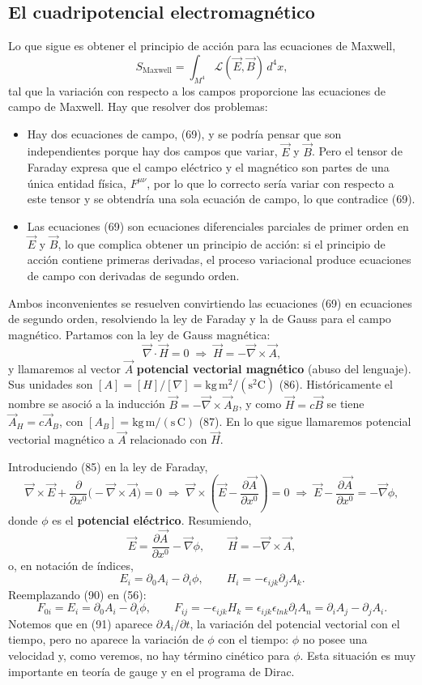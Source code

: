 \subsection{El cuadripotencial electromagnético}

Lo que sigue es obtener el principio de acción para las ecuaciones de
Maxwell,
\[
S_{\text{Maxwell}}=\int_{M^4}\mathscr{L}(\vec E,\vec B)\,d^4x, \tag{84}
\]
tal que la variación con respecto a los campos proporcione las
ecuaciones de campo de Maxwell. Hay que resolver dos problemas:
\begin{itemize}
\item Hay dos ecuaciones de campo, (69), y se podría pensar que son
independientes porque hay dos campos que variar, $\vec E$ y $\vec B$.
Pero el tensor de Faraday expresa que el campo eléctrico y el magnético
son partes de una única entidad física, $F^{\mu\nu}$, por lo que lo
correcto sería variar con respecto a este tensor y se obtendría una sola
ecuación de campo, lo que contradice (69).
\item Las ecuaciones (69) son ecuaciones diferenciales parciales de
primer orden en $\vec E$ y $\vec B$, lo que complica obtener un
principio de acción: si el principio de acción contiene primeras
derivadas, el proceso variacional produce ecuaciones de campo con
derivadas de segundo orden.
\end{itemize}
Ambos inconvenientes se resuelven convirtiendo las ecuaciones (69) en
ecuaciones de segundo orden, resolviendo la ley de Faraday y la de Gauss
para el campo magnético. Partamos con la ley de Gauss magnética:
\[
\vec\nabla\cdot\vec H=0\;\Longrightarrow\;\vec H=-\vec\nabla\times\vec A,
\tag{85}
\]
y llamaremos al vector $\vec A$ \textbf{potencial vectorial magnético}
(abuso del lenguaje). Sus unidades son $[A]=[H]/[\nabla]=\text{kg}\,
\text{m}^2/(\text{s}^2\text{C})$ (86). Históricamente el nombre se asoció
a la inducción $\vec B=-\vec\nabla\times\vec A_B$, y como $\vec H=c\vec B$
se tiene $\vec A_H=c\vec A_B$, con $[A_B]=\text{kg}\,\text{m}/(\text{s}\,
\text{C})$ (87). En lo que sigue llamaremos potencial vectorial magnético
a $\vec A$ relacionado con $\vec H$.

Introduciendo (85) en la ley de Faraday,
\[
\vec\nabla\times\vec E+\frac{\partial}{\partial x^0}\big(-\vec\nabla\times
\vec A\big)=0\;\Longrightarrow\;\vec\nabla\times\left(\vec E-\frac{
\partial\vec A}{\partial x^0}\right)=0\;\Longrightarrow\;\vec E-\frac{
\partial\vec A}{\partial x^0}=-\vec\nabla\phi, \tag{88}
\]
donde $\phi$ es el \textbf{potencial eléctrico}. Resumiendo,
\[
\vec E=\frac{\partial\vec A}{\partial x^0}-\vec\nabla\phi, \qquad
\vec H=-\vec\nabla\times\vec A, \tag{89}
\]
o, en notación de índices,
\[
E_i=\partial_0A_i-\partial_i\phi, \qquad H_i=-\epsilon_{ijk}\partial_jA_k.
\tag{90}
\]
Reemplazando (90) en (56):
\[
F_{0i}=E_i=\partial_0A_i-\partial_i\phi, \qquad F_{ij}=-\epsilon_{ijk}H_k=
\epsilon_{ijk}\epsilon_{lnk}\partial_lA_n=\partial_iA_j-\partial_jA_i.
\tag{91}
\]
Notemos que en (91) aparece $\partial A_i/\partial t$, la variación del
potencial vectorial con el tiempo, pero no aparece la variación de
$\phi$ con el tiempo: $\phi$ no posee una velocidad y, como veremos, no
hay término cinético para $\phi$. Esta situación es muy importante en
teoría de gauge y en el programa de Dirac.

